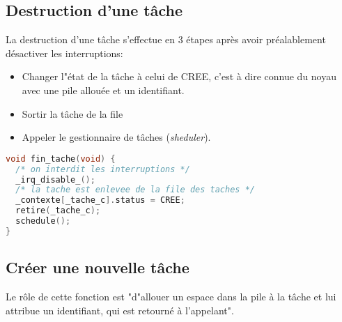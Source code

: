 \subsection{Destruction d'une tâche}
La destruction d'une tâche s'effectue en 3 étapes après avoir préalablement désactiver les interruptions:
\begin{itemize}
    \item Changer l"état de la tâche à celui de CREE, c'est à dire connue du noyau avec une pile allouée et un identifiant.
    \item Sortir la tâche de la file
    \item Appeler le gestionnaire de tâches (\textit{sheduler}).
\end{itemize}
\begin{lstlisting}[language=C, caption=noyau.c]
void fin_tache(void) {
  /* on interdit les interruptions */
  _irq_disable_();
  /* la tache est enlevee de la file des taches */
  _contexte[_tache_c].status = CREE;
  retire(_tache_c);
  schedule();
}
\end{lstlisting}

\subsection{Créer une nouvelle tâche}
Le rôle de cette fonction est "d"allouer un espace dans la pile à la tâche et lui attribue un identifiant, qui est retourné à l’appelant".

